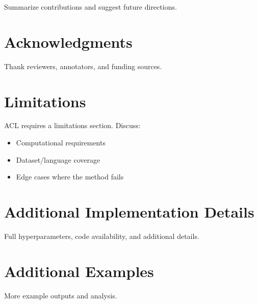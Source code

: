 \documentclass[11pt]{article}
\begin{document}
Summarize contributions and suggest future directions.

\section*{Acknowledgments}

Thank reviewers, annotators, and funding sources.

\section*{Limitations}

ACL requires a limitations section. Discuss:
\begin{itemize}
    \item Computational requirements
    \item Dataset/language coverage
    \item Edge cases where the method fails
\end{itemize}




\appendix

\section{Additional Implementation Details}
\label{app:implementation}

Full hyperparameters, code availability, and additional details.

\section{Additional Examples}
\label{app:examples}

More example outputs and analysis.
\end{document}
